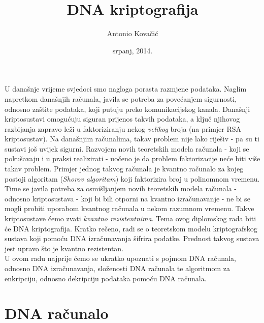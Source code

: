 \documentclass[a4paper,oneside,12pt]{memoir} %
\title{DNA kriptografija}
\author{Antonio Kovačić}
\date{srpanj, 2014.}  %
\begin{document}
\begin{spacing}{1.5}
\frontmatter


\begin{intro}

U današnje vrijeme svjedoci smo nagloga porasta razmjene podataka. Naglim napretkom današnjih računala, javila se potreba za povećanjem sigurnosti, odnosno zaštite podataka, koji putuju preko komunikacijskog kanala. Današnji kriptosustavi omogućuju siguran prijenos takvih podataka, a ključ njihovog razbijanja zapravo leži u faktoriziranju nekog \textit{velikog} broja (na primjer \textsc{RSA} kriptosustav). Na današnjim računalima, takav problem nije lako riješiv - pa su ti sustavi još uvijek sigurni. Razvojem novih teoretskih modela računala - koji se pokušavaju i u praksi realizirati - uočeno je da problem faktorizacije neće biti više takav problem. Primjer jednog takvog računala je kvantno računalo za kojeg postoji algoritam (\textit{Shorov algoritam}) koji faktorizira broj u polinomnom vremenu.
Time se javila potreba za osmišljanjem  novih teoretskih modela računala - odnosno kriptosustava - koji bi bili otporni na kvantno izračunavanje - ne bi se mogli probiti uporabom kvantnog računala u nekom razumnom vremenu. Takve kriptosustave ćemo zvati \textit{kvantno rezistentnima}.
Tema ovog diplomskog rada biti će DNA kriptografija. Kratko rečeno, radi se o teoretskom modelu kriptografskog sustava koji pomoću DNA izračunavanja šifrira podatke. Prednost takvog sustava jest upravo što je kvantno rezistentan.\\[0.2cm]
U ovom radu najprije ćemo se ukratko upoznati s pojmom DNA računala, odnosno DNA izračunavanja, složenosti DNA računala te algoritmom za enkripciju, odnosno dekripciju podataka pomoću DNA računala.
\end{intro}
\chapter{DNA računalo}

\end{spacing}
\end{document}
